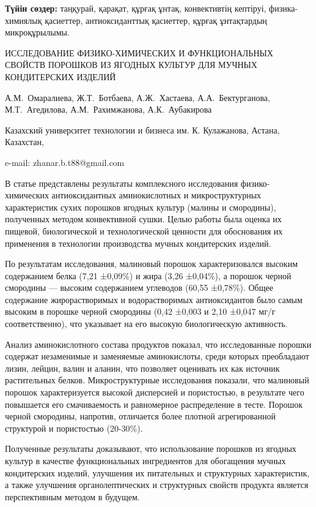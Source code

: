 {\bfseries Түйін сөздер:} таңқурай, қарақат, құрғақ ұнтақ, конвективтің
кептіруі, физика-химиялық қасиеттер, антиоксиданттық қасиеттер, құрғақ
ұнтақтардың микроқұрылымы.
\vspace{2em}
\begin{header}
ИССЛЕДОВАНИЕ ФИЗИКО-ХИМИЧЕСКИХ И ФУНКЦИОНАЛЬНЫХ СВОЙСТВ ПОРОШКОВ ИЗ ЯГОДНЫХ КУЛЬТУР ДЛЯ МУЧНЫХ КОНДИТЕРСКИХ ИЗДЕЛИЙ

А.М.~Омаралиева,
Ж.Т.~Ботбаева\envelope,
А.Ж.~Хастаева,
А.А.~Бектурганова,
М.Т.~Агедилова,
А.М.~Рахимжанова,
А.К.~Аубакирова
\end{header}

\begin{affil}
Казахский университет технологии и бизнеса им. К. Кулажанова, Астана, Казахстан,

e-mail: zhanar.b.t88@gmail.com
\end{affil}

В статье представлены результаты комплексного исследования
физико-химических антиоксидантных аминокислотных и микроструктурных
характеристик сухих порошков ягодных культур (малины и смородины),
полученных методом конвективной сушки. Целью работы была оценка их
пищевой, биологической и технологической ценности для обоснования их
применения в технологии производства мучных кондитерских изделий.

По результатам исследования, малиновый порошок характеризовался высоким
содержанием белка (7,21 ±0,09\%) и жира (3,26 ±0,04\%), а порошок черной
смородины --- высоким содержанием углеводов (60,55 ±0,78\%). Общее
содержание жирорастворимых и водорастворимых антиоксидантов было самым
высоким в порошке черной смородины (0,42 ±0,003 и 2,10 ±0,047 мг/г
соответственно), что указывает на его высокую биологическую активность.

Анализ аминокислотного состава продуктов показал, что исследованные
порошки содержат незаменимые и заменяемые аминокислоты, среди которых
преобладают лизин, лейцин, валин и аланин, что позволяет оценивать их
как источник растительных белков. Микроструктурные исследования
показали, что малиновый порошок характеризуется высокой дисперсией и
пористостью, в результате чего повышается его смачиваемость и
равномерное распределение в тесте. Порошок черной смородины, напротив,
отличается более плотной агрегированной структурой и пористостью
(20-30\%).

Полученные результаты доказывают, что использование порошков из ягодных
культур в качестве функциональных ингредиентов для обогащения мучных
кондитерских изделий, улучшения их питательных и структурных
характеристик, а также улучшения органолептических и структурных свойств
продукта является перспективным методом в будущем.

